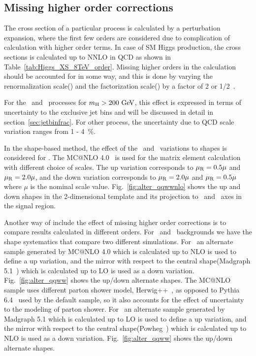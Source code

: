 \subsection{Missing higher order corrections} 

The cross section of a particular process is calculated by a perturbation expansion, 
where the first few orders are considered due to complication of calculation 
with higher order terms. In case of SM Higgs production, the cross sections is calculated 
up to NNLO in QCD as shown in Table~\ref{tab:Higgs_XS_8TeV_order}. Missing higher orders 
in the calculation should be accounted for in some way, and this is done by 
varying the renormalization scale(\mR) and the factorization scale(\mF) 
by a factor of 2 or 1/2~\cite{Dittmaier:1318996}. 

For the \ggH\ and \qqww\ processes for $m_{\mathrm{H}}>200~\mathrm{Ge\kern -0.1em V}$, 
this effect is expressed in terms of uncertainty to the 
exclusive jet bins and will be discussed in detail in section~\ref{sec:jetbinfrac}. 
For other process, the uncertainty due to QCD scale variation ranges from 1 - 4~\%.   

In the shape-based method, the effect of the \mR\ and \mF\ variations to shapes 
is considered for \qqww. The MC@NLO 4.0~\cite{Frixione:2002ik} is used for the matrix element calculation 
with different choice of scales. The up variation corresponds to $\mu_\mathrm{R}=0.5\mu$ and $\mu_\mathrm{R}=2.0\mu$,
and the down variation corresponds to $\mu_\mathrm{R}=2.0\mu$ and $\mu_\mathrm{R}=0.5\mu$ where $\mu$ is the nominal 
scale value. Fig.~\ref{fig:alter_qqwwnlo} shows the up and down  
shapes in the 2-dimensional template and its projection to \mT\ and \mll\ axes
in the signal region.

Another way of include the effect of missing higher order corrections 
is to compare results calculated in different orders. For \qqww\ and \topbkg\ 
backgrounds we have the shape systematics that compare two different simulations. 
For \qqww\ an alternate sample generated by MC@NLO 4.0 which is calculated up to NLO
is used to define a up variation, 
and the mirror with respect to the central shape(Madgraph 5.1~\cite{Madgraph5p1}) which is calculated up to LO 
is used as a down variation.
Fig.~\ref{fig:alter_qqww} shows the up/down alternate shapes. 
The MC@NLO sample uses different parton shower model, Herwig++~\cite{Corcella:2000bw}, 
as opposed to 
Pythia 6.4~\cite{Sjostrand:2006za} used by the default sample, 
so it also accounts for the effect of uncertainty 
to the modeling of parton shower. 
For \topbkg\ an alternate sample generated by Madgraph 5.1 which is calculated up to LO
is used to define a up variation,
and the mirror with respect to the central shape(Powheg~\cite{Frixione:2007vw}) which is calculated up to NLO 
is used as a down variation.
Fig.~\ref{fig:alter_qqww} shows the up/down alternate shapes. 

